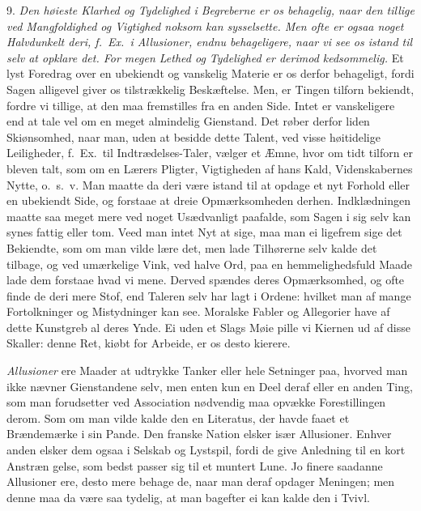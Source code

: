 \documentclass[12pt,a4paper]{article}
\newcommand{\opage}[1]{\marginnote{\footnotesize\textit{[#1]}}}
\begin{document}
9. \emph{Den høieste Klarhed og Tydelighed i Begreberne er os behagelig, naar den tillige
ved Mangfoldighed og Vigtighed noksom kan sysselsette. Men ofte er ogsaa noget Halvdunkelt
deri, f.~Ex.\ i Allusioner, endnu behageligere, naar vi see os istand til selv at opklare
det. For megen Lethed og Tydelighed er derimod kedsommelig.} Et lyst Foredrag over en
ubekiendt og vanskelig Materie er os derfor behageligt, fordi Sagen alligevel giver os
tilstrækkelig Beskæftelse. Men, er Tingen tilforn bekiendt, fordre vi tillige, at den maa
fremstilles fra en anden Side. Intet er vanskeligere end at tale vel om en meget almindelig
Gienstand. Det røber derfor liden Skiønsomhed, naar man, uden at besidde dette Talent, ved
visse høitidelige Leiligheder, f.~Ex.\ til Indtrædelses-Taler, vælger et Æmne, hvor%
\opage{246}om tidt tilforn er bleven talt, som om en Lærers Pligter, Vigtigheden af hans Kald,
Videnskabernes Nytte, o.~s.~v. Man maatte da deri være istand til at opdage et nyt Forhold
eller en ubekiendt Side, og forstaae at dreie Opmærksomheden derhen. Indklædningen maatte
saa meget mere ved noget Usædvanligt paafalde, som Sagen i sig selv kan synes fattig eller
tom. Veed man intet Nyt at sige, maa man ei ligefrem sige det Bekiendte, som om man vilde
lære det, men lade Tilhørerne selv kalde det tilbage, og ved umærkelige Vink, ved halve
Ord, paa en hemmelighedsfuld Maade lade dem forstaae hvad vi mene. Derved spændes deres
Opmærksomhed, og ofte finde de deri mere Stof, end Taleren selv har lagt i Ordene: hvilket
man af mange Fortolkninger og Mistydninger kan see. Moralske Fabler og Allegorier have af
dette Kunstgreb al deres Ynde. Ei uden et Slags Møie pille vi Kiernen ud af disse Skaller:
denne Ret, kiøbt for Arbeide, er os desto kierere.

\emph{Allusioner} ere Maader at udtrykke Tanker eller hele Setninger paa, hvorved man ikke
nævner Gienstandene selv, men enten kun en Deel deraf eller en anden Ting, som man
forudsetter ved Association nødvendig maa opvække Forestillingen derom. Som om man vilde
kalde den en Literatus, der havde faaet et Brændemærke i sin Pande. Den franske Nation
elsker især Allusioner. Enhver anden elsker dem ogsaa i Selskab og Lystspil, fordi de give
Anledning til en kort Anstræn%
\opage{247}gelse, som bedst passer sig til et muntert Lune. Jo finere saadanne Allusioner ere, desto
mere behage de, naar man deraf opdager Meningen; men denne maa da være saa tydelig, at man
bagefter ei kan kalde den i Tvivl.
\end{document}

